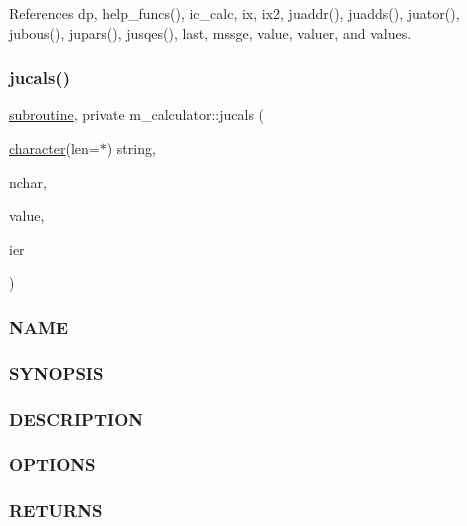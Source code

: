 References dp, help\+\_\+funcs(), ic\+\_\+calc, ix, ix2, juaddr(), juadds(), juator(), jubous(), jupars(), jusqes(), last, mssge, value, valuer, and values.

\mbox{\label{namespacem__calculator_a1461bad85da11d09210daefe3f80973d}} 
\subsubsection{\texorpdfstring{jucals()}{jucals()}}
{\footnotesize\ttfamily \hyperlink{M__stopwatch_83_8txt_acfbcff50169d691ff02d4a123ed70482}{subroutine}, private m\+\_\+calculator\+::jucals (\begin{DoxyParamCaption}\item[{\hyperlink{option__stopwatch_83_8txt_abd4b21fbbd175834027b5224bfe97e66}{character}(len=$\ast$)}]{string,  }\item[{}]{nchar,  }\item[{}]{value,  }\item[{}]{ier }\end{DoxyParamCaption})\hspace{0.3cm}{\ttfamily [private]}}



\subsubsection*{N\+A\+ME}

\subsubsection*{S\+Y\+N\+O\+P\+S\+IS}

\subsubsection*{D\+E\+S\+C\+R\+I\+P\+T\+I\+ON}

\subsubsection*{O\+P\+T\+I\+O\+NS}

\subsubsection*{R\+E\+T\+U\+R\+NS}

